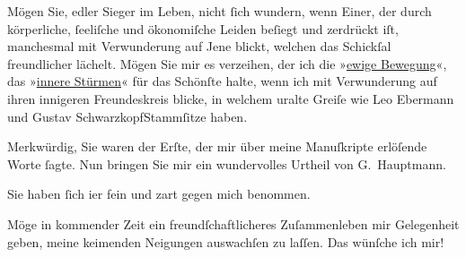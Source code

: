 \pstart
           Mögen Sie, edler Sieger im Leben, nicht{ }ſich wundern, wenn Einer, der durch
               körperliche,{ }ſeeliſche und ökonomiſche Leiden beſiegt und zerdrückt \introOben{}iſt\introOben{}, manchesmal mit Verwunderung auf Jene blickt, {\pb}welchen das Schickſal freundlicher
               lächelt. Mögen Sie mir es verzeihen, der ich die »\uline{ewige
                  Bewegung}«, das »\uline{innere Stürmen}« für das
               Schönſte halte, wenn ich mit Verwunderung auf ihren innigeren Freundeskreis blicke,
               in welchem uralte Greiſe wie Leo Ebermann und
                  Gustav SchwarzkopfStammſitze haben.\pend
           
\pstart
           Merkwürdig, Sie waren der Erſte, der mir über meine Manuſkripte erlöſende Worte{ }ſagte. Nun bringen Sie mir ein wundervolles Urtheil{ }{\pb}von G. Hauptmann.\pend
           
\pstart
           Sie haben{ }ſich i{\geminationm}er fein und zart gegen mich
               benommen.\pend
           
\pstart
           Möge in kommender Zeit ein freundſchaftlicheres
               Zuſammenleben mir Gelegenheit geben, meine keimenden Neigungen auswachſen zu laſſen.
               Das wünſche ich mir!\pend
           
